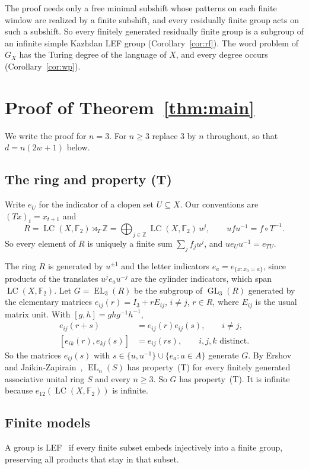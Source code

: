 \documentclass[11pt]{amsart}
\newcommand{\F}{\mathbb F}
\newcommand{\Z}{\mathbb Z}
\newcommand{\LC}{\operatorname{LC}}
\newcommand{\EL}{\operatorname{EL}}
\newcommand{\GL}{\operatorname{GL}}
\begin{document}
The proof needs only a free minimal subshift whose patterns on each
finite window are realized by a finite subshift, and every residually
finite group acts on such a subshift. So every finitely generated
residually finite group is a subgroup of an infinite simple Kazhdan LEF
group (Corollary~\ref{cor:rf}). The word problem of $G_X$ has the Turing
degree of the language of $X$, and every degree occurs
(Corollary~\ref{cor:wp}).

\section{Proof of Theorem~\ref{thm:main}}

We write the proof for $n=3$. For $n\ge3$ replace $3$ by $n$ throughout,
so that $d=n(2w+1)$ below.

\subsection*{The ring and property (T)}
Write $e_U$ for the indicator of a clopen set $U\subseteq X$. Our
conventions are $(Tx)_t=x_{t+1}$ and
\[
 R=\LC(X,\F_2)\rtimes_T\Z=\bigoplus_{j\in\Z}\LC(X,\F_2)\,u^j,
 \qquad ufu^{-1}=f\circ T^{-1}.
\]
So every element of $R$ is uniquely a finite sum $\sum_jf_ju^j$, and
$ue_Uu^{-1}=e_{TU}$.

The ring $R$ is generated by $u^{\pm1}$ and the letter indicators
$e_a=e_{\{x:x_0=a\}}$, since products of the translates $u^je_au^{-j}$
are the cylinder indicators, which span $\LC(X,\F_2)$. Let $G=\EL_3(R)$
be the subgroup of $\GL_3(R)$ generated by the elementary matrices
$e_{ij}(r)=I_3+rE_{ij}$, $i\ne j$, $r\in R$, where $E_{ij}$ is the usual
matrix unit. With $[g,h]=ghg^{-1}h^{-1}$,
\begin{equation}\label{eq:elementary}
 \begin{aligned}
 e_{ij}(r+s)&=e_{ij}(r)e_{ij}(s),\qquad i\ne j,\\
 [e_{ik}(r),e_{kj}(s)]&=e_{ij}(rs),\qquad i,j,k\text{ distinct}.
 \end{aligned}
\end{equation}
So the matrices $e_{ij}(s)$ with $s\in\{u,u^{-1}\}\cup\{e_a:a\in A\}$
generate $G$. By Ershov and Jaikin-Zapirain~\cite[Theorem~1.1]{EJZ},
$\EL_n(S)$ has property~\textup{(T)} for every finitely generated
associative unital ring $S$ and every $n\ge3$. So $G$ has
property~\textup{(T)}. It is infinite because $e_{12}(\LC(X,\F_2))$ is
infinite.

\subsection*{Finite models}
A group is LEF~\cite{VershikGordon} if every finite subset embeds
injectively into a finite group, preserving all products that stay in
that subset.
\end{document}
